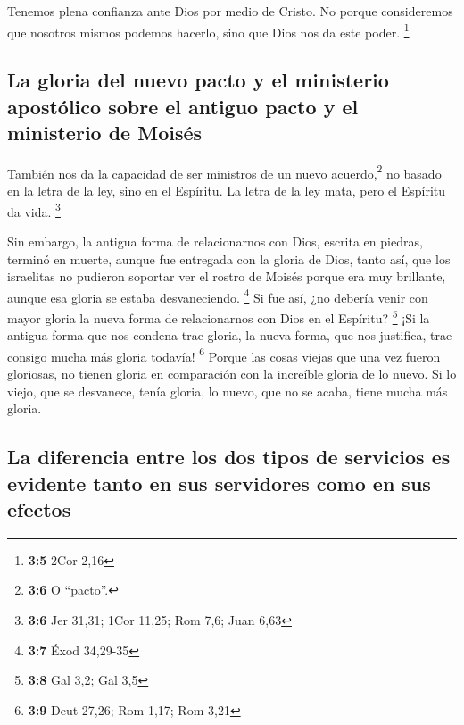  Tenemos plena confianza ante Dios por medio de Cristo.
 No porque consideremos que nosotros mismos podemos
hacerlo, sino que Dios nos da este poder. \footnote{\textbf{3:5} 2Cor
  2,16}

\hypertarget{la-gloria-del-nuevo-pacto-y-el-ministerio-apostuxf3lico-sobre-el-antiguo-pacto-y-el-ministerio-de-moisuxe9s}{%
\subsection{La gloria del nuevo pacto y el ministerio apostólico sobre
el antiguo pacto y el ministerio de
Moisés}\label{la-gloria-del-nuevo-pacto-y-el-ministerio-apostuxf3lico-sobre-el-antiguo-pacto-y-el-ministerio-de-moisuxe9s}}

 También nos da la capacidad de ser ministros de un nuevo
acuerdo,\footnote{\textbf{3:6} O ``pacto''.} no basado en la letra de la
ley, sino en el Espíritu. La letra de la ley mata, pero el Espíritu da
vida. \footnote{\textbf{3:6} Jer 31,31; 1Cor 11,25; Rom 7,6; Juan 6,63}

 Sin embargo, la antigua forma de relacionarnos con Dios,
escrita en piedras, terminó en muerte, aunque fue entregada con la
gloria de Dios, tanto así, que los israelitas no pudieron soportar ver
el rostro de Moisés porque era muy brillante, aunque esa gloria se
estaba desvaneciendo. \footnote{\textbf{3:7} Éxod 34,29-35}
 Si fue así, ¿no debería venir con mayor gloria la nueva
forma de relacionarnos con Dios en el Espíritu? \footnote{\textbf{3:8}
  Gal 3,2; Gal 3,5}  ¡Si la antigua forma que nos condena
trae gloria, la nueva forma, que nos justifica, trae consigo mucha más
gloria todavía! \footnote{\textbf{3:9} Deut 27,26; Rom 1,17; Rom 3,21}
 Porque las cosas viejas que una vez fueron gloriosas, no
tienen gloria en comparación con la increíble gloria de lo nuevo.
 Si lo viejo, que se desvanece, tenía gloria, lo nuevo,
que no se acaba, tiene mucha más gloria.

\hypertarget{la-diferencia-entre-los-dos-tipos-de-servicios-es-evidente-tanto-en-sus-servidores-como-en-sus-efectos}{%
\subsection{La diferencia entre los dos tipos de servicios es evidente
tanto en sus servidores como en sus
efectos}\label{la-diferencia-entre-los-dos-tipos-de-servicios-es-evidente-tanto-en-sus-servidores-como-en-sus-efectos}}

